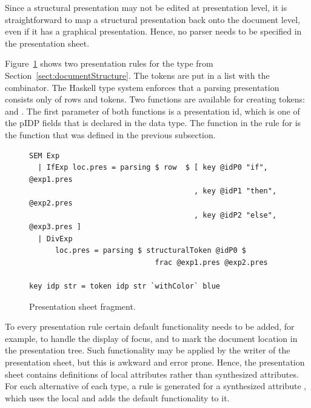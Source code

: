 \documentclass[12pt]{article}
\begin{document}
Since a structural presentation may not be edited at presentation level, it is straightforward to map a structural presentation back onto the document level, even if it has a graphical presentation. Hence, no parser needs to be specified in the presentation sheet.

Figure~\ref{fig:presentationSheet} shows two presentation rules for the type  from Section~\ref{sect:documentStructure}. The tokens are put in a list with the  combinator. The Haskell type system enforces that a parsing presentation consists only of rows and tokens. Two functions are available for creating tokens:  and . The first parameter of both functions is a presentation id, which is one of the p{IDP} fields that is declared in the data type. The function  in the rule for  is the function that was defined in the previous subsection.

\begin{figure}
\begin{center}
\begin{footnotesize}
\begin{verbatim}
SEM Exp
  | IfExp loc.pres = parsing $ row  $ [ key @idP0 "if",   @exp1.pres
                                      , key @idP1 "then", @exp2.pres
                                      , key @idP2 "else", @exp3.pres ]
  | DivExp
      loc.pres = parsing $ structuralToken @idP0 $ 
                             frac @exp1.pres @exp2.pres
                  
key idp str = token idp str `withColor` blue 
\end{verbatim}%
\end{footnotesize}
\caption{Presentation sheet fragment.} \label{fig:presentationSheet} 
\end{center}
\end{figure}

To every presentation rule certain default functionality needs to be added, for example, to handle the display of focus, and to mark the document location in the presentation tree. Such functionality may be applied by the writer of the presentation sheet, but this is awkward and error prone. Hence, the presentation sheet contains definitions of local attributes  rather than synthesized attributes. For each alternative of each type, a rule is generated for a synthesized attribute , which uses the local  and adds the default functionality to it.
\end{document}

